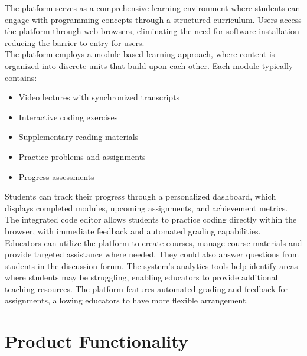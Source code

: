\documentclass[a4paper, 11pt]{scrreprt}
\begin{document}
The platform serves as a comprehensive learning environment where students can engage with programming concepts through a structured curriculum. Users access the platform through web browsers, eliminating the need for software installation reducing the barrier to entry for users. \\

The platform employs a module-based learning approach, where content is organized into discrete units that build upon each other. Each module typically contains:

\begin{itemize}
    \item Video lectures with synchronized transcripts
    \item Interactive coding exercises
    \item Supplementary reading materials
    \item Practice problems and assignments
    \item Progress assessments
\end{itemize}

Students can track their progress through a personalized dashboard, which displays completed modules, upcoming assignments, and achievement metrics. The integrated code editor allows students to practice coding directly within the browser, with immediate feedback and automated grading capabilities. \\

Educators can utilize the platform to create courses, manage course materials and provide targeted assistance where needed. They could also answer questions from students in the discussion forum. The system's analytics tools help identify areas where students may be struggling, enabling educators to provide additional teaching resources. The platform features automated grading and feedback for assignments, allowing educators to have more flexible arrangement. 

\section{Product Functionality}
\end{document}
